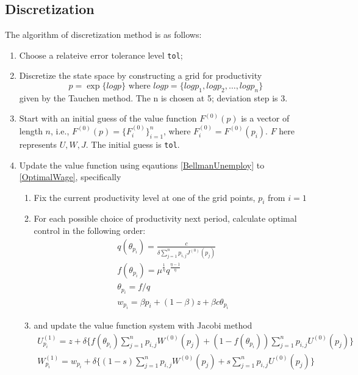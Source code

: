 \documentclass[10pt]{article} %
\begin{document}
    \subsection{Discretization}
    The algorithm of discretization method is as follows:
    \begin{enumerate}
        \item Choose a relateive error tolerance level \texttt{tol};
        \item Discretize the state space by constructing a grid for productivity \[
            p = \exp\{logp\}
            \text{\ where\ } logp = \{logp_1, logp_2, \ldots, logp_n\} \] given by the Tauchen method.
            The n is chosen at 5; deviation step is 3. 
        \item Start with an initial guess of the value function \(F^{(0)}(p)\) is a vector of length \(n\), i.e., \(F^{(0)}(p) = \{F^{(0)}_i\}_{i=1}^n\), where \(F^{(0)}_i = F^{(0)}(p_i)\).
            \(F\) here represents \(U, W, J\). The initial guess is \texttt{tol}.
        \label{update}
        \item Update the value function using eqautions \ref{BellmanUnemploy} to \ref{OptimalWage}, specifically
            \begin{enumerate}
                \item Fix the current productivity level at one of the grid points, \(p_i\) from \(i=1\)
                \item For each possible choice of productivity next period, calculate optimal control in the following order:
                \begin{gather*}
                    q(\theta_{p_i}) = \frac{c}{\delta \sum_{j=1}^{n}p_{i,j}J^{(0)}(p_j)}\\
                    f(\theta_{p_i}) = \mu^\frac{1}{\eta} q^\frac{\eta-1}{\eta}\\
                    \theta_{p_i} = f/q\\
                    w_{p_i} = \beta p_i + (1-\beta)z + \beta c \theta_{p_i}
                \end{gather*}
                \item and update the value function system with Jacobi method
                \begin{gather*}
                    U^{(1)}_{p_i} = z + \delta\{f(\theta_{p_i})\sum_{j=1}^{n}p_{i,j}W^{(0)}(p_j) + (1-f(\theta_{p_i}))\sum_{j=1}^{n}p_{i,j}U^{(0)}(p_j)\}\\
                    W^{(1)}_{p_i} = w_{p_i} + \delta\{(1-s)\sum_{j=1}^{n}p_{i,j}W^{(0)}(p_j) + s\sum_{j=1}^{n}p_{i,j}U^{(0)}(p_j)\}\\

\end{gather*}
\end{enumerate}
\end{enumerate}
\end{document}
